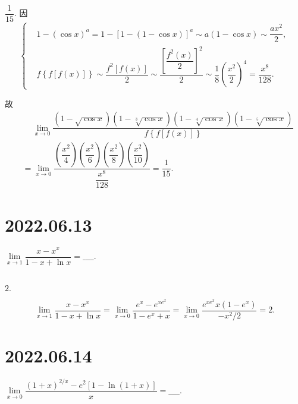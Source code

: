 \documentclass[lang=cn,12pt]{elegantbook}
\begin{document}
\begin{solution}
  $\dfrac{1}{15}.$ 
  因 $$\begin{cases}
    &1- \left(\cos x\right)^a = 1 - \left[1-\left(1-\cos x\right)\right]^a 
      \sim a(1-\cos x) \sim \dfrac{ax^2}{2},\\
    &f\left\{f\left[f\left(x\right)\right]\right\} \sim 
      \dfrac{f^2\left[f\left(x\right)\right]}{2} \sim
      \dfrac{\left[\dfrac{f^2\left(x\right)}{2}\right]^2}{2}\sim 
      \dfrac{1}{8}\left(\dfrac{x^2}{2}\right)^4 = \dfrac{x^8}{128}.
  \end{cases}$$

  故 $$\begin{aligned}
    &\quad \ \lim\limits_{x \to 0} 
      \dfrac{\left(1-\sqrt{\cos x}\right)\left(1-\sqrt[3]{\cos x}\right)
      \left(1-\sqrt[4]{\cos x}\right)\left(1-\sqrt[5]{\cos x}\right)}
      {f\left\{f\left[f\left(x\right)\right]\right\}} \\
    &= \lim\limits_{x \to 0} \dfrac{\left(\dfrac{x^2}{4}\right)\left(\dfrac{x^2}{6}\right)
    \left(\dfrac{x^2}{8}\right)\left(\dfrac{x^2}{10}\right)}
    {\dfrac{x^8}{128}}=\dfrac{1}{15}.
  \end{aligned}$$

\end{solution}

\newpage

\section*{2022.06.13}

$\lim\limits_{x \to 1} \dfrac{x - x^x}{1 - x + \ln x} = \_\_\_\_.$
\\ \\

\begin{solution}
  $2.$

  $$\lim\limits_{x \to 1} \dfrac{x - x^x}{1 - x + \ln x}
  = \lim\limits_{x \to 0} \dfrac{e^x - e^{x e^x}}{1 - e^x + x}
  = \lim\limits_{x \to 0} \dfrac{e^{x e^x}x(1 - e^x)}{-x^2/2}
  = 2.
  $$

\end{solution}


\section*{2022.06.14}

$\lim\limits_{x \to 0} \dfrac{\left(1+x\right)^{2/x} - e^2\left[1-\ln(1+x)\right]}{x} = \_\_\_\_.$
\\ \\
\end{document}
